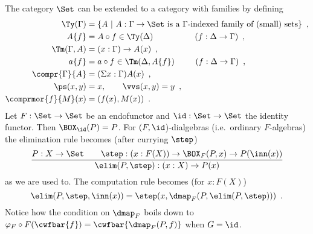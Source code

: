 \documentclass{article}
\begin{document}
\begin{example}[The elimination rule in $\Set$ with $G = \id$]
  The category $\Set$ can be extended to a category with families by
  defining
  \begin{align*}
\Ty(\Gamma) & = \{ A\ \vert\ \text{$A : \Gamma \to \Set$ is a $\Gamma$-indexed family of (small) sets}\} \enspace ,\\
A\{f\} & = A \circ f \in \Ty(\Delta) \qquad\qquad\quad \text{($f : \Delta \to \Gamma$)} \enspace,\\ 
\Tm(\Gamma, A) & = (x : \Gamma) \to A(x) \enspace,\\
a\{f\} &= a \circ f \in \Tm(\Delta, A\{f\}) \ \,\qquad \text{($f : \Delta \to \Gamma$)} \enspace,\\
\compr{\Gamma}{A} & = (\Sigma x : \Gamma)A(x) \enspace,\\
\ps(x, y) & = x , \qquad \vvs(x, y)  = y \enspace,\\
\comprmor{f}{M}(x) & = (f(x), M(x)) \enspace .
  \end{align*}
%
  Let $F : \Set \to \Set$ be an endofunctor and $\id : \Set \to \Set$
  the identity functor. Then $\BOX_{\id}(P) = P$.  For $(F,
  \id$)-dialgebras (i.e.\ ordinary $F$-algebras) the elimination rule
  becomes (after currying $\step$)
\begin{align*}
\frac{P : X \to \Set \qquad
      \step : (x : F(X)) \to  \BOX_F(P, x) \to P(\inn(x))}
    {\elim(P, \step) : (x : X) \to P(x)}
\label{eq:elim-set}
\end{align*}
 as we are used to. The computation rule becomes (for $x : F(X)$)
\[
\elim(P, \step, \inn(x)) = \step(x, \dmap_F(P, \elim(P, \step))) \enspace .
\]
%
Notice how the condition on $\dmap_F$ boils down to $\varphi_F \circ
F(\cwfbar{f}) = \cwfbar{\dmap_F(P, f)}$ when $G = \id$.
\end{example}




\end{document}

